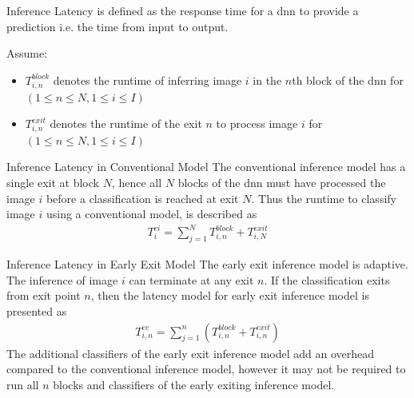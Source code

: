 	\begin{enumdescript}
		\item[Inference Latency] is defined as the response time for a \gls{dnn} to provide a prediction i.e. the time from input to output. 

		Assume:
		\begin{itemize}
			\item $T_{i,n}^{block}$ denotes the runtime of inferring image $ i $ in the $ n $th block of the \gls{dnn} for $ \left(1\leq n \leq N, 1 \leq i \leq I\right) $
			\item $T_{i,n}^{exit}$ denotes the runtime of the exit $ n $  to process image $i$ for $ \left(1\leq n \leq N, 1 \leq i \leq I\right) $
		\end{itemize}
		\begin{enumdescript}
			\item[Inference Latency in Conventional Model] The conventional inference model has a single exit at block $ N $, hence all $ N $ blocks of the \gls{dnn} must have processed the image $ i $ before a classification is reached at exit $ N $. Thus the runtime to classify image $ i $ using a conventional model, is described as
			\begin{align}
			T^{ci}_{i}= \sum_{j=1}^{N} T_{i,n}^{block} + T_{i,N}^{exit}
			\end{align}
			\item[Inference Latency in Early Exit Model] The early exit inference model is adaptive. The inference of image $ i $ can terminate at any exit $ n $. If the classification exits from exit point $ n $, then the latency model for early exit inference model is presented as
			\begin{align}
			T_{i,n}^{ee}=\sum_{j=1}^{n} \left(T_{i,n}^{block} + T_{i,n}^{exit} \right) 
			\end{align}
			The additional classifiers of the early exit inference model add an overhead compared to the conventional inference model, however it may not be required to run all $ n $ blocks and classifiers of the early exiting inference model. 
		\end{enumdescript}
		

\end{enumdescript}
